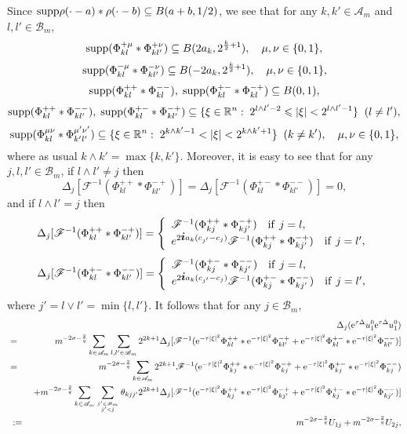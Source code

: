 \documentclass[11pt]{article}
\newcommand{\supp}{{\rm supp}}
\newcommand{\bfi}{{\mbox{\boldmath $i$}}}
\newcommand{\rme}{{\rm e}}
\begin{document}
  Since $\supp\rho(\cdot-a)\ast\rho(\cdot-b)\subseteq B(a+b,1/2)$, we see that for any $k,k'\in\mathscr{A}_m$ and
  $l,l'\in\mathscr{B}_m$,
$$
  \supp(\Phi_{kl}^{+\mu}\ast\Phi_{kl'}^{+\nu})\subseteq B(2a_k,2^{\frac{k}{2}+1}), \quad \mu,\nu\in\{0,1\},
$$
$$
  \supp(\Phi_{kl}^{-\mu}\ast\Phi_{kl'}^{-\nu})\subseteq B(-2a_k,2^{\frac{k}{2}+1}), \quad \mu,\nu\in\{0,1\},
$$
$$
  \supp(\Phi_{kl}^{++}\ast\Phi_{kl}^{--}),\;\supp(\Phi_{kl}^{+-}\ast\Phi_{kl}^{-+})\subseteq B(0,1),
$$
$$
  \supp(\Phi_{kl}^{++}\ast\Phi_{kl'}^{--}),\;\supp(\Phi_{kl}^{+-}\ast\Phi_{kl'}^{-+})\subseteq
  \{\xi\in\mathbb{R}^n:\;2^{l\wedge l'-2}\leqslant|\xi|<2^{l\wedge l'-1}\} \;\;  (l\neq l'),
$$
$$
  \supp(\Phi_{kl}^{\mu\nu}\ast\Phi_{k'l'}^{\mu'\nu'})\subseteq \{\xi\in\mathbb{R}^n:\;2^{k\wedge k'-1}<|\xi|<2^{k\wedge k'+1}\}
  \;\;  (k\neq k'), \quad \mu,\nu\in\{0,1\},
$$
  where as usual $k\wedge k'=\max\{k,k'\}$. Moreover, it is easy to see that for any $j,l,l'\in\mathscr{B}_m$, if $l\wedge l'\neq j$ then
$$
  \Delta_j[\mathscr{F}^{-1}(\Phi_{kl}^{++}\ast\Phi_{kl'}^{-+})]=\Delta_j[\mathscr{F}^{-1}(\Phi_{kl}^{+-}\ast\Phi_{kl'}^{--})]=0,
$$
  and if $l\wedge l'=j$ then
$$
  \Delta_j[\mathscr{F}^{-1}(\Phi_{kl}^{++}\ast\Phi_{kl'}^{-+})]=
\left\{
\begin{array}{l}
  \mathscr{F}^{-1}(\Phi_{kj}^{++}\ast\Phi_{kj'}^{-+}) \quad \mbox{if}\;\, j=l,\\
  e^{2{\bfi}a_k(c_{j'}-c_j)}\mathscr{F}^{-1}(\Phi_{kj}^{++}\ast\Phi_{kj'}^{-+}) \quad \mbox{if}\;\, j=l',
\end{array}
\right.
$$
$$
  \Delta_j[\mathscr{F}^{-1}(\Phi_{kl}^{+-}\ast\Phi_{kl'}^{--})]=
\left\{
\begin{array}{l}
  \mathscr{F}^{-1}(\Phi_{kj}^{+-}\ast\Phi_{kj'}^{--}) \quad \mbox{if}\;\, j=l,\\
  e^{2{\bfi}a_k(c_{j'}-c_j)}\mathscr{F}^{-1}(\Phi_{kj}^{+-}\ast\Phi_{kj'}^{--}) \quad \mbox{if}\;\, j=l',
\end{array}
\right.
$$
  where $j'=l\vee l'=\min\{l,l'\}$. It follows that for any $j\in\mathscr{B}_m$,
\begin{eqnarray}
  &&\Delta_j(\rme^{\tau\Delta}u_1^0\rme^{\tau\Delta}u_1^0)
\nonumber\\
  &= & m^{-2\sigma-\frac{2}{q}}\sum_{k\in\mathscr{A}_m}\sum_{l,l'\in\mathscr{B}_m}2^{2k+1}
  \Delta_j[\mathscr{F}^{-1}(\rme^{-\tau|\xi|^2}\Phi_{kl}^{++}\ast\rme^{-\tau|\xi|^2}\Phi_{kl'}^{-+}
  +\rme^{-\tau|\xi|^2}\Phi_{kl}^{+-}\ast\rme^{-\tau|\xi|^2}\Phi_{kl'}^{--})]
\nonumber\\
  &= & m^{-2\sigma-\frac{2}{q}}\sum_{k\in\mathscr{A}_m}2^{2k+1}\mathscr{F}^{-1}
  (\rme^{-\tau|\xi|^2}\Phi_{kj}^{++}\ast\rme^{-\tau|\xi|^2}\Phi_{kj}^{-+}
  +\rme^{-\tau|\xi|^2}\Phi_{kj}^{+-}\ast\rme^{-\tau|\xi|^2}\Phi_{kj}^{--})
\nonumber\\
  && +m^{-2\sigma-\frac{2}{q}}\sum_{k\in\mathscr{A}_m}\sum_{{j'\in\mathscr{B}_m\atop j'<j}}\theta_{kjj'}2^{2k+1}
  \Delta_j[\mathscr{F}^{-1}(\rme^{-\tau|\xi|^2}\Phi_{kj}^{++}\ast\rme^{-\tau|\xi|^2}\Phi_{kj'}^{-+}
  +\rme^{-\tau|\xi|^2}\Phi_{kj}^{+-}\ast\rme^{-\tau|\xi|^2}\Phi_{kj'}^{--})]
\nonumber\\
  &\;:=\; & m^{-2\sigma-\frac{2}{q}}U_{1j}+m^{-2\sigma-\frac{2}{q}}U_{2j},
\end{eqnarray}
\end{document}
